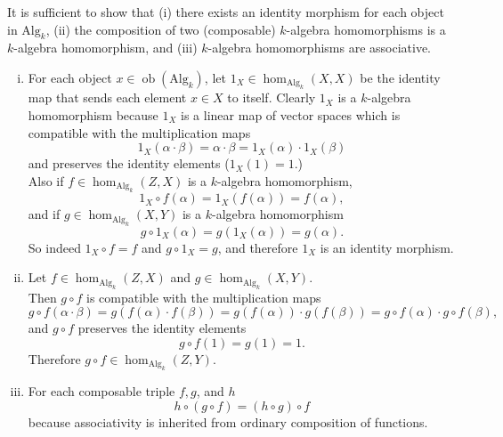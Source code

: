 \documentclass{article}
\newenvironment{problem}[2][Problem]{\begin{trivlist}
\item[\hskip \labelsep {\bfseries #1}\hskip \labelsep {\bfseries #2.}]}{\end{trivlist}}
\newenvironment{problempart}[1]{\begin{trivlist}\item[\textbf{Part #1.}]}{\end{trivlist}}
\begin{document}
\pagebreak

\begin{problem}{7} $ $\\
  \begin{problempart}{(a)}
    It is sufficient to show that
    (i) there exists an identity morphism for each object in $\text{Alg}_k$,
    (ii) the composition of two (composable) $k$-algebra homomorphisms is a
      $k$-algebra homomorphism, and
    (iii) $k$-algebra homomorphisms are associative.
    \begin{enumerate}[(i)]
      \item For each object $x\in\operatorname{ob}(\text{Alg}_k)$, let
        $1_X \in \operatorname{hom}_{\text{Alg}_k}(X,X)$ be the
        identity map that sends each element $x \in X$ to itself.
        Clearly $1_X$ is a $k$-algebra homomorphism because $1_X$ is a linear map
        of vector spaces which is compatible with the multiplication maps \[
          1_X(\alpha \cdot \beta) = \alpha \cdot \beta
          = 1_X(\alpha) \cdot 1_X(\beta)
        \] and preserves the identity elements ($1_X(1) = 1.$)\\
        Also if $f \in \operatorname{hom}_{\text{Alg}_k}(Z,X)$ is a $k$-algebra
        homomorphism, \[
          1_X \circ f(\alpha) = 1_X(f(\alpha)) = f(\alpha),
        \] and if $g \in \operatorname{hom}_{\text{Alg}_k}(X,Y)$ is a $k$-algebra
        homomorphism \[
          g\circ 1_X(\alpha) = g(1_X(\alpha)) = g(\alpha).
        \] So indeed $1_X \circ f = f$ and $g \circ 1_X = g$, and therefore $1_X$
        is an identity morphism.
      \item Let
        $f \in \operatorname{hom}_{\text{Alg}_k}(Z,X)$ and
        $g \in \operatorname{hom}_{\text{Alg}_k}(X,Y)$.\\
        Then $g \circ f$ is compatible with the multiplication maps \[
          g \circ f(\alpha \cdot \beta) = g(f(\alpha) \cdot f(\beta))
          = g(f(\alpha)) \cdot g(f(\beta))
          = g\circ f(\alpha) \cdot g\circ f(\beta),
        \] and $g \circ f$ preserves the identity elements \[
          g\circ f(1) = g(1) = 1.
        \] Therefore $g \circ f \in \operatorname{hom}_{\text{Alg}_k}(Z,Y)$.
      \item For each composable triple $f, g$, and $h$ \[
      h \circ (g \circ f) = (h \circ g) \circ f
      \] because associativity is inherited from ordinary composition of functions.
    \end{enumerate}

\end{problempart}
\end{problem}
\end{document}
